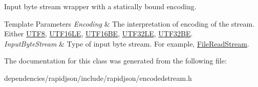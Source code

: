 Input byte stream wrapper with a statically bound encoding. 


\begin{DoxyTemplParams}{Template Parameters}
{\em Encoding} & The interpretation of encoding of the stream. Either \hyperlink{struct_u_t_f8}{U\+T\+F8}, \hyperlink{struct_u_t_f16_l_e}{U\+T\+F16\+LE}, \hyperlink{struct_u_t_f16_b_e}{U\+T\+F16\+BE}, \hyperlink{struct_u_t_f32_l_e}{U\+T\+F32\+LE}, \hyperlink{struct_u_t_f32_b_e}{U\+T\+F32\+BE}. \\
\hline
{\em Input\+Byte\+Stream} & Type of input byte stream. For example, \hyperlink{class_file_read_stream}{File\+Read\+Stream}. \\
\hline
\end{DoxyTemplParams}


The documentation for this class was generated from the following file\+:\begin{DoxyCompactItemize}
\item 
dependencies/rapidjson/include/rapidjson/encodedstream.\+h\end{DoxyCompactItemize}
